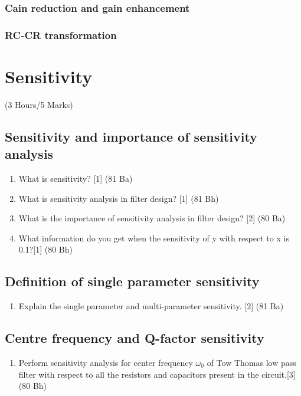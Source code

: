 \documentclass[12pt]{article}
\begin{document}
\subsubsection{Cain reduction and gain enhancement}
\subsubsection{RC-CR transformation}

\pagebreak
\section{Sensitivity}
\begin{center}(3 Hours/5 Marks)\end{center}
\subsection{Sensitivity and importance of sensitivity analysis}
\begin{enumerate}
    \item What is sensitivity? \hfill [1] (81 Ba)
\item What is sensitivity analysis in filter design? \hfill [1] (81 Bh)
\item What is the importance of sensitivity analysis in filter design? \hfill[2] (80 Ba)
\item What information do you get when the sensitivity of y with respect to x is 0.1?\hfill [1] (80 Bh)
\end{enumerate}
\subsection{Definition of single parameter sensitivity}
    \begin{enumerate}[noitemsep, topsep=0pt]
        \item Explain the single parameter and multi-parameter sensitivity. \hfill [2] (81 Ba)
    \end{enumerate}

\subsection{Centre frequency and Q-factor sensitivity}
\begin{enumerate}
\item Perform sensitivity analysis for center frequency $\omega_0$ of Tow Thomas low pass filter with respect to all the resistors and capacitors present in the circuit.\hfill[3] (80 Bh)
\end{enumerate}
\end{document}
